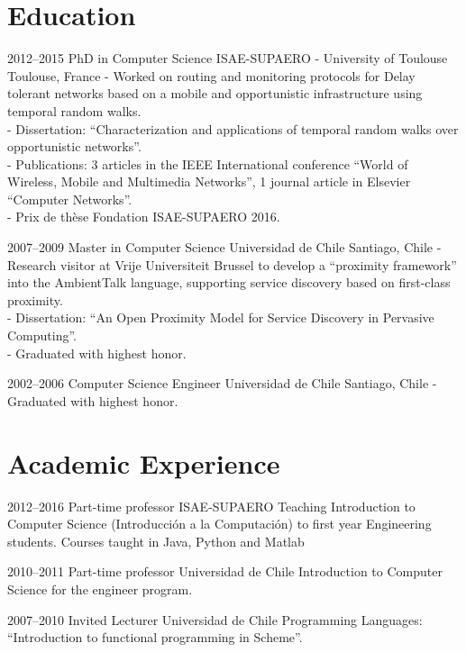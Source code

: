 \documentclass[10pt,a4paper,sans]{moderncv}
\newif\iffullversion
\begin{document}

\section{Education}

\cventry
{2012--2015}
{PhD in Computer Science}
{ISAE-SUPAERO - University of Toulouse}
{Toulouse, France}
{}
{
- Worked on routing and monitoring protocols for Delay tolerant networks based on a mobile and opportunistic infrastructure using temporal random walks.\\
- Dissertation: ``Characterization and applications of temporal random walks over opportunistic networks''.\\
- Publications: 3 articles in the IEEE International conference ``World of Wireless, Mobile and Multimedia Networks'', 1 journal article in Elsevier ``Computer Networks''.\\
- Prix de thèse Fondation ISAE-SUPAERO 2016.
}

\cventry
{2007--2009}
{Master in Computer Science}
{Universidad de Chile}
{Santiago, Chile}
{}
{
- Research visitor at Vrije Universiteit Brussel to develop a ``proximity framework'' into the AmbientTalk language, supporting service discovery based on first-class proximity.\\
- Dissertation: ``An Open Proximity Model for Service Discovery in Pervasive Computing''.\\
- Graduated with highest honor.
}

\cventry
{2002--2006}
{Computer Science Engineer}
{Universidad de Chile}
{Santiago, Chile}
{}
{
- Graduated with highest honor.
}


\iffullversion
\section{Academic Experience}
\cventry
{2012--2016}
{Part-time professor}
{ISAE-SUPAERO}
{}
{}
{
Teaching Introduction to Computer Science (Introducción a la Computación) to first year Engineering students. Courses taught in Java, Python and Matlab
}

\cventry
{2010--2011}
{Part-time 
professor}
{Universidad de Chile}
{}
{}
{
Introduction to Computer Science for the engineer program.
}

\cventry
{2007--2010}
{Invited Lecturer}
{Universidad de Chile}
{}
{}
{
Programming Languages: ``Introduction to functional programming in Scheme''.
}
\end{document}
